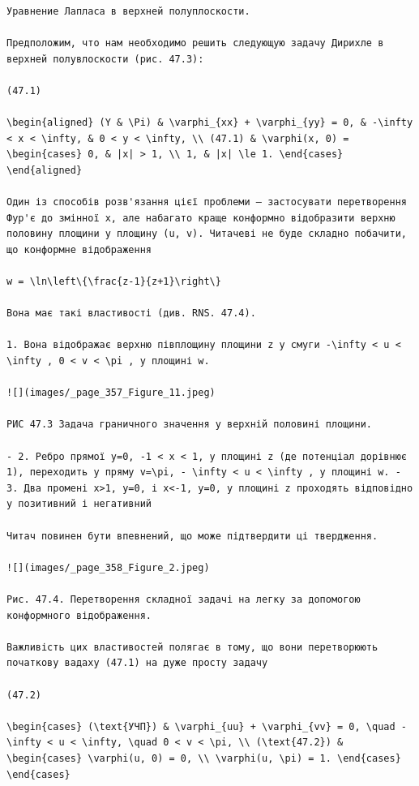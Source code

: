 \documentclass[
  ukrainian,
]{article}
\begin{document}
\begin{verbatim}
Уравнение Лапласа в верхней полуплоскости.

Предположим, что нам необходимо решить следующую задачу Дирихле в верхней полувлоскости (рис. 47.3):

(47.1)

\begin{aligned} (Y & \Pi) & \varphi_{xx} + \varphi_{yy} = 0, & -\infty < x < \infty, & 0 < y < \infty, \\ (47.1) & \varphi(x, 0) = \begin{cases} 0, & |x| > 1, \\ 1, & |x| \le 1. \end{cases} \end{aligned}

Один із способів розв'язання цієї проблеми — застосувати перетворення Фур'є до змінної x, але набагато краще конформно відобразити верхню половину площини у площину (u, v). Читачеві не буде складно побачити, що конформне відображення

w = \ln\left\{\frac{z-1}{z+1}\right\}

Вона має такі властивості (див. RNS. 47.4).

1. Вона відображає верхню півплощину площини z у смуги -\infty < u < \infty , 0 < v < \pi , у площині w.

![](images/_page_357_Figure_11.jpeg)

РИС 47.3 Задача граничного значення у верхній половині площини.

- 2. Ребро прямої y=0, -1 < x < 1, у площині z (де потенціал дорівнює 1), переходить у пряму v=\pi, - \infty < u < \infty , у площині w. - 3. Два промені x>1, y=0, і x<-1, y=0, у площині z проходять відповідно у позитивний і негативний

Читач повинен бути впевнений, що може підтвердити ці твердження.

![](images/_page_358_Figure_2.jpeg)

Рис. 47.4. Перетворення складної задачі на легку за допомогою конформного відображення.

Важливість цих властивостей полягає в тому, що вони перетворюють початкову вадаху (47.1) на дуже просту задачу

(47.2)

\begin{cases} (\text{УЧП}) & \varphi_{uu} + \varphi_{vv} = 0, \quad -\infty < u < \infty, \quad 0 < v < \pi, \\ (\text{47.2}) & \begin{cases} \varphi(u, 0) = 0, \\ \varphi(u, \pi) = 1. \end{cases} \end{cases}


\end{verbatim}
\end{document}
